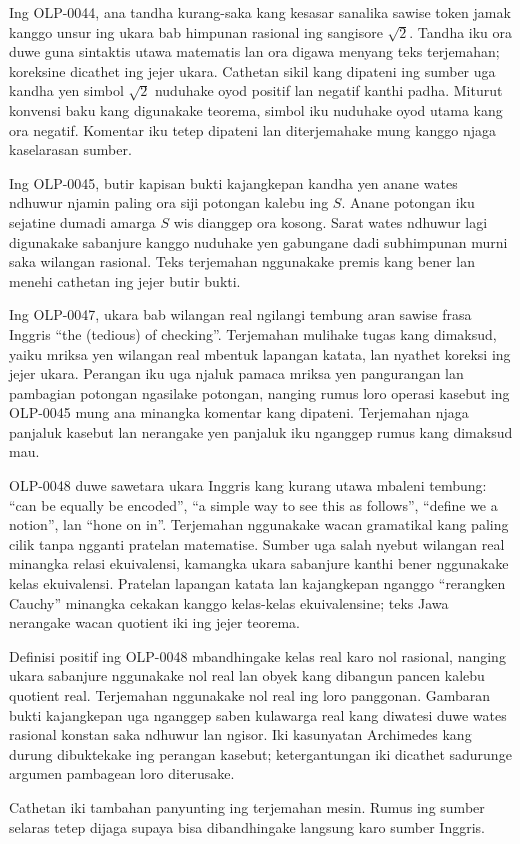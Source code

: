 Ing OLP-0044, ana tandha kurang-saka kang kesasar sanalika sawise
token jamak kanggo unsur ing ukara bab himpunan rasional ing sangisore
$\sqrt{2}$. Tandha iku ora duwe guna sintaktis utawa matematis lan
ora digawa menyang teks terjemahan; koreksine dicathet ing jejer ukara.
Cathetan sikil kang dipateni ing sumber uga kandha yen simbol
$\sqrt{2}$ nuduhake oyod positif lan negatif kanthi padha. Miturut
konvensi baku kang digunakake teorema, simbol iku nuduhake oyod utama
kang ora negatif. Komentar iku tetep dipateni lan diterjemahake mung
kanggo njaga kaselarasan sumber.

Ing OLP-0045, butir kapisan bukti kajangkepan kandha yen anane wates
ndhuwur njamin paling ora siji potongan kalebu ing $S$. Anane potongan
iku sejatine dumadi amarga $S$ wis dianggep ora kosong. Sarat wates
ndhuwur lagi digunakake sabanjure kanggo nuduhake yen gabungane dadi
subhimpunan murni saka wilangan rasional. Teks terjemahan nggunakake
premis kang bener lan menehi cathetan ing jejer butir bukti.

Ing OLP-0047, ukara bab wilangan real ngilangi tembung aran sawise
frasa Inggris ``the (tedious) of checking''. Terjemahan mulihake tugas
kang dimaksud, yaiku mriksa yen wilangan real mbentuk lapangan katata,
lan nyathet koreksi ing jejer ukara. Perangan iku uga njaluk pamaca
mriksa yen pangurangan lan pambagian potongan ngasilake potongan,
nanging rumus loro operasi kasebut ing OLP-0045 mung ana minangka
komentar kang dipateni. Terjemahan njaga panjaluk kasebut lan nerangake
yen panjaluk iku nganggep rumus kang dimaksud mau.

OLP-0048 duwe sawetara ukara Inggris kang kurang utawa mbaleni tembung:
``can be equally be encoded'', ``a simple way to see this as follows'',
``define we a notion'', lan ``hone on in''. Terjemahan nggunakake wacan
gramatikal kang paling cilik tanpa ngganti pratelan matematise. Sumber
uga salah nyebut wilangan real minangka relasi ekuivalensi, kamangka
ukara sabanjure kanthi bener nggunakake kelas ekuivalensi. Pratelan
lapangan katata lan kajangkepan nganggo ``rerangken Cauchy'' minangka
cekakan kanggo kelas-kelas ekuivalensine; teks Jawa nerangake wacan
quotient iki ing jejer teorema.

Definisi positif ing OLP-0048 mbandhingake kelas real karo nol rasional,
nanging ukara sabanjure nggunakake nol real lan obyek kang dibangun
pancen kalebu quotient real. Terjemahan nggunakake nol real ing loro
panggonan. Gambaran bukti kajangkepan uga nganggep saben kulawarga real
kang diwatesi duwe wates rasional konstan saka ndhuwur lan ngisor.
Iki kasunyatan Archimedes kang durung dibuktekake ing perangan kasebut;
ketergantungan iki dicathet sadurunge argumen pambagean loro diterusake.

Cathetan iki tambahan panyunting ing terjemahan mesin.
Rumus ing sumber selaras tetep dijaga supaya
bisa dibandhingake langsung karo sumber Inggris.

